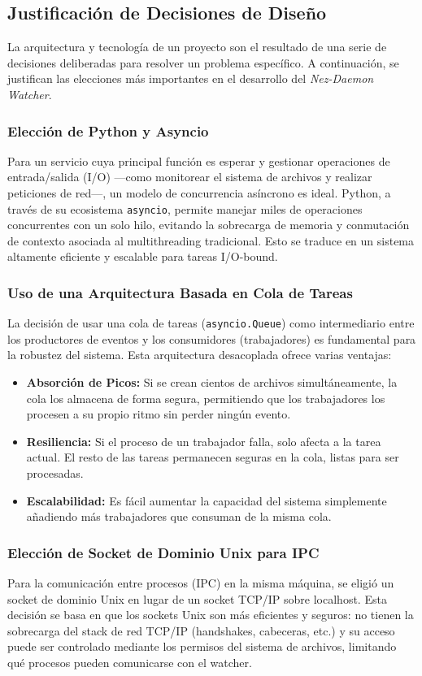 \subsection{Justificación de Decisiones de Diseño}
La arquitectura y tecnología de un proyecto son el resultado de una serie de decisiones deliberadas para resolver un problema específico. A continuación, se justifican las elecciones más importantes en el desarrollo del \textit{Nez-Daemon Watcher}.

\subsubsection{Elección de Python y Asyncio}
Para un servicio cuya principal función es esperar y gestionar operaciones de entrada/salida (I/O) —como monitorear el sistema de archivos y realizar peticiones de red—, un modelo de concurrencia asíncrono es ideal. Python, a través de su ecosistema \texttt{asyncio}, permite manejar miles de operaciones concurrentes con un solo hilo, evitando la sobrecarga de memoria y conmutación de contexto asociada al multithreading tradicional. Esto se traduce en un sistema altamente eficiente y escalable para tareas I/O-bound.

\subsubsection{Uso de una Arquitectura Basada en Cola de Tareas}
La decisión de usar una cola de tareas (\texttt{asyncio.Queue}) como intermediario entre los productores de eventos y los consumidores (trabajadores) es fundamental para la robustez del sistema. Esta arquitectura desacoplada ofrece varias ventajas:
\begin{itemize}
    \item \textbf{Absorción de Picos:} Si se crean cientos de archivos simultáneamente, la cola los almacena de forma segura, permitiendo que los trabajadores los procesen a su propio ritmo sin perder ningún evento.
    \item \textbf{Resiliencia:} Si el proceso de un trabajador falla, solo afecta a la tarea actual. El resto de las tareas permanecen seguras en la cola, listas para ser procesadas.
    \item \textbf{Escalabilidad:} Es fácil aumentar la capacidad del sistema simplemente añadiendo más trabajadores que consuman de la misma cola.
\end{itemize}

\subsubsection{Elección de Socket de Dominio Unix para IPC}
Para la comunicación entre procesos (IPC) en la misma máquina, se eligió un socket de dominio Unix en lugar de un socket TCP/IP sobre localhost. Esta decisión se basa en que los sockets Unix son más eficientes y seguros: no tienen la sobrecarga del stack de red TCP/IP (handshakes, cabeceras, etc.) y su acceso puede ser controlado mediante los permisos del sistema de archivos, limitando qué procesos pueden comunicarse con el watcher.

